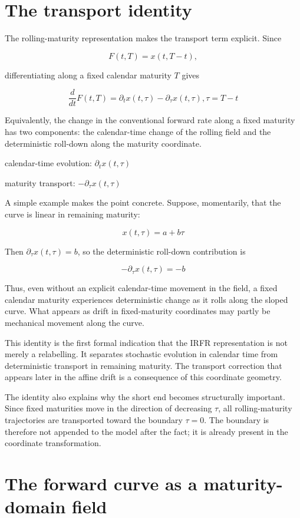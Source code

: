 \documentclass[11pt,oneside]{book}
\begin{document}
\section{The transport identity}\label{the-transport-identity}

The rolling-maturity representation makes the transport term explicit.
Since

\[
F(t,T) = x(t,T-t),
\]

differentiating along a fixed calendar maturity \(T\) gives

\[
\frac{d}{dt} F(t,T) = \partial_t  x(t,\tau) - \partial_\tau x(t,\tau), \tau = T - t
\]

Equivalently, the change in the conventional forward rate along a fixed
maturity has two components: the calendar-time change of the rolling
field and the deterministic roll-down along the maturity coordinate.

calendar-time evolution: $\partial_t x(t,\tau)$

maturity transport: $-\partial_\tau x(t,\tau)$

A simple example makes the point concrete. Suppose, momentarily, that
the curve is linear in remaining maturity:

\[
x(t,\tau) = a + b\tau
\]

Then $\partial_\tau x(t,\tau)=b$, so the deterministic roll-down contribution is

\[
-\partial_\tau x(t,\tau) = -b
\]

Thus, even without an explicit calendar-time movement in the field, a
fixed calendar maturity experiences deterministic change as it rolls
along the sloped curve. What appears as drift in fixed-maturity
coordinates may partly be mechanical movement along the curve.

This identity is the first formal indication that the IRFR
representation is not merely a relabelling. It separates stochastic
evolution in calendar time from deterministic transport in remaining
maturity. The transport correction that appears later in the affine
drift is a consequence of this coordinate geometry.

The identity also explains why the short end becomes structurally
important. Since fixed maturities move in the direction of decreasing $\tau$,
all rolling-maturity trajectories are transported toward the boundary
$\tau=0$. The boundary is therefore not appended to the model after the fact;
it is already present in the coordinate transformation.

\section{The forward curve as a maturity-domain
field}\label{the-forward-curve-as-a-maturity-domain-field}
\end{document}

